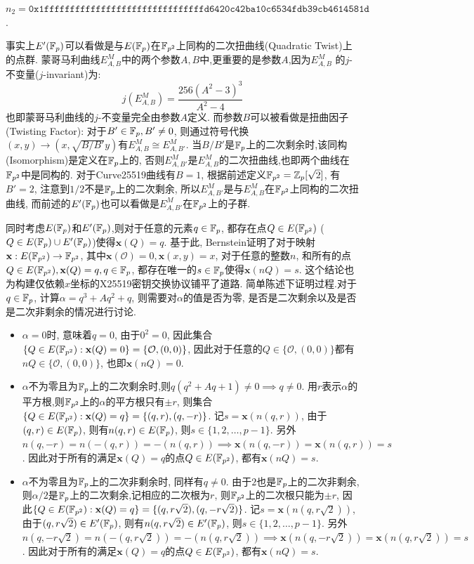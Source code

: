 \centerline{$n_2=\texttt{0x1fffffffffffffffffffffffffffffffd6420c42ba10c6534fdb39cb4614581d}$.}
事实上$E'(\mathbb{F}_p)$可以看做是与$E(\mathbb{F}_p)$在$\mathbb{F}_{p^2}$上同构的二次扭曲线(Quadratic Twist)上的点群.
蒙哥马利曲线$E_{A,B}^M$中的两个参数$A, B$中,更重要的是参数$A$,因为$E_{A,B}^M$
的$j$-不变量($j$-invariant)为:
$$j(E_{A,B}^M) = \frac{256(A^2-3)^3}{A^2-4}$$
也即蒙哥马利曲线的$j$-不变量完全由参数$A$定义.
而参数$B$可以被看做是扭曲因子(Twisting Factor): 对于$B' \in \mathbb{F}_p, B' \neq 0$,
则通过符号代换$(x,y)\rightarrow(x,\sqrt{B/B'}y)$有$E_{A,B}^M \cong E_{A,B'}^M$.
当$B/B'$是$\mathbb{F}_p$上的二次剩余时,该同构(Isomorphism)是定义在$\mathbb{F}_p$上的,
否则$E_{A,B'}^M$是$E_{A,B}^M$的二次扭曲线,也即两个曲线在$\mathbb{F}_{p^2}$中是同构的.
对于Curve25519曲线有$B=1$, 根据前述定义$\mathbb{F}_{p^2} = \mathbb{Z}_{p}[\sqrt{2}]$, 
有$B'=2$, 注意到$1/2$不是$\mathbb{F}_p$上的二次剩余,
所以$E_{A,B'}^M$是与$E_{A,B}^M$在$\mathbb{F}_{p^2}$上同构的二次扭曲线,
而前述的$E'(\mathbb{F}_p)$也可以看做是$E_{A,B'}^M$在$\mathbb{F}_{p^2}$上的子群.

同时考虑$E(\mathbb{F}_p)$和$E'(\mathbb{F}_p)$,则对于任意的元素$q\in\mathbb{F}_p$,
都存在点$Q\in E(\mathbb{F}_{p^2})$ ($Q\in E(\mathbb{F}_p) \cup E'(\mathbb{F}_p)$)使得$\mathbf{x}(Q) = q$.
基于此, Bernstein证明了对于映射$\mathbf{x}: E(\mathbb{F}_{p^2})\rightarrow \mathbb{F}_{p^2}$, 
其中$\mathbf{x}(\mathcal{O}) = 0, \mathbf{x}(x,y) = x$, 对于任意的整数$n$,
和所有的点$Q\in E(\mathbb{F}_{p^2}), \mathbf{x}(Q) = q, q \in \mathbb{F}_p$, 
都存在唯一的$s\in\mathbb{F}_p$使得$\mathbf{x}(nQ) = s$. 
这个结论也为构建仅依赖$x$坐标的X25519密钥交换协议铺平了道路.
简单陈述下证明过程.对于$q\in\mathbb{F}_p$, 计算$\alpha = q^3 + Aq^2 + q$,
则需要对$\alpha$的值是否为零, 是否是二次剩余以及是否是二次非剩余的情况进行讨论.
\begin{itemize}
\item 
$\alpha = 0$时, 意味着$q=0$, 由于$0^2 = 0$, 因此集合$\{ Q\in E(\mathbb{F}_{p^2}): \mathbf{x}(Q) = 0 \} 
= \{ \mathcal{O}, (0,0) \}$, 因此对于任意的$Q\in\{ \mathcal{O}, (0,0)\}$都有$nQ \in \{ \mathcal{O}, (0,0)\}$,
也即$\mathbf{x}(nQ) = 0$.
\item 
$\alpha$不为零且为$\mathbb{F}_p$上的二次剩余时,则$q(q^2 + Aq + 1) \neq 0 \implies q\neq 0$.
用$r$表示$\alpha$的平方根,则$\mathbb{F}_{p^2}$上的$\alpha$的平方根只有$\pm r$, 则集合
$\{ Q\in E(\mathbb{F}_{p^2}): \mathbf{x}(Q) = q \} = \{ (q,r), (q,-r) \}$.
记$s = \mathbf{x}(n(q,r))$, 由于$(q,r)\in E(\mathbb{F}_{p})$, 则有$n(q,r)\in E(\mathbb{F}_p)$, 则$s\in \{1,2,\ldots, p-1\}$.
另外$n(q,-r) = n(-(q,r)) = -(n(q,r)) \implies \mathbf{x}(n(q,-r)) = \mathbf{x}(n(q,r)) = s$.
因此对于所有的满足$\mathbf{x}(Q) = q$的点$Q\in E(\mathbb{F}_{p^2})$, 都有$\mathbf{x}(nQ) = s$.
\item
$\alpha$不为零且为$\mathbb{F}_p$上的二次非剩余时, 同样有$q\neq0$. 由于$2$也是$\mathbb{F}_p$上的二次非剩余,
则$\alpha/2$是$\mathbb{F}_p$上的二次剩余,记相应的二次根为$r$, 则$\mathbb{F}_{p^2}$上的二次根只能为$\pm r$,
因此$\{ Q\in E(\mathbb{F}_{p^2}): \mathbf{x}(Q) = q \} = \{ (q,r\sqrt{2}), (q,-r\sqrt{2}) \}$.
记$s = \mathbf{x}(n(q, r\sqrt{2}))$,
由于$(q,r\sqrt{2})\in E'(\mathbb{F}_{p})$, 则有$n(q,r\sqrt{2})\in E'(\mathbb{F}_p)$, 则$s\in \{1,2,\ldots, p-1\}$.
另外$n(q,-r\sqrt{2}) = n(-(q,r\sqrt{2})) = -(n(q,r\sqrt{2})) \implies 
\mathbf{x}(n(q,-r\sqrt{2})) = \mathbf{x}(n(q,r\sqrt{2})) = s$.
因此对于所有的满足$\mathbf{x}(Q) = q$的点$Q\in E(\mathbb{F}_{p^2})$, 都有$\mathbf{x}(nQ) = s$.
\end{itemize}

